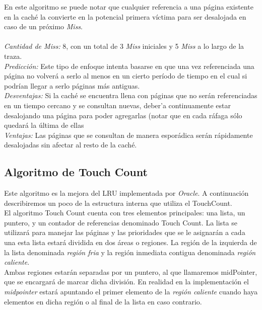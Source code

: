 \documentclass[11pt, a4paper, spanish]{article}
\begin{document}
En este algoritmo se puede notar que cualquier referencia a una p\'agina existente en la cach\'e la convierte en la potencial primera v\'ictima 
para ser desalojada en caso de un pr\'oximo \textit{Miss}.\\

\\
\emph{Cantidad de Miss:} 8, con un total de 3 \textit{Miss} iniciales y 5 \textit{Miss} a lo largo de la traza. \\
\emph{Predicci\'on:} Este tipo de enfoque intenta basarse en que una vez referenciada una p\'agina no volver\'a a serlo al menos en un cierto per\'iodo
de tiempo en el cual si podr\'ian llegar a serlo p\'aginas m\'as antiguas.\\
\emph{Desventajas:} Si la cach\'e se encuentra llena con p\'aginas que no ser\'an referenciadas en un tiempo cercano y se consultan nuevas, deber'a continuamente estar desalojando una p\'agina para poder agregarlas (notar que en cada r\'afaga s\'olo quedar\'a la \'ultima de ellas\\
\emph{Ventajas:} Las p\'aginas que se consultan de manera espor\'adica ser\'an r\'apidamente desalojadas sin afectar al resto de la cach\'e.\\

\newpage
\subsection{Algoritmo de Touch Count}

Este algoritmo es la mejora del LRU implementada por \textit{Oracle}. A continuaci\'on describiremos un poco de la estructura interna que utiliza el TouchCount.\\

El algoritmo Touch Count cuenta con tres elementos principales: una lista, un puntero, y un contador de referencias denominado Touch Count. 
La lista se utilizar\'a para manejar las p\'aginas y las prioridades que se le asignar\'an a cada
una esta lista estar\'a dividida en dos \'areas o regiones. La regi\'on de la izquierda de la lista denominada \textit{regi\'on fria} y la regi\'on inmediata
contigua denominada \textit{regi\'on caliente}.\\

Ambas regiones estar\'an separadas por un puntero, al que llamaremos midPointer, que se encargar\'a de marcar dicha divisi\'on. 
En realidad en la implementaci\'on el \textit{midpointer} estar\'a apuntando el primer elemento de la \textit{regi\'on caliente} cuando haya
elementos en dicha regi\'on o al final de la lista en caso contrario.\\
\end{document}
